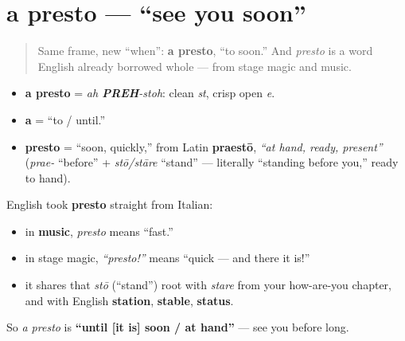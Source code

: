 \section[a presto]{a presto — \textquotedblleft{}see you soon\textquotedblright{}}

\label{lesson:IT-C04-a-presto}



\begin{quote}
Same frame, new \textquotedblleft{}when\textquotedblright{}: \textbf{a presto}, \textquotedblleft{}to soon.\textquotedblright{} And \emph{presto} is a word English already borrowed whole — from stage magic and music.
\end{quote}

\begin{sounds}
\begin{itemize}
\raggedright
  \item \textbf{a presto} = \emph{ah \textbf{PREH}-stoh}: clean \emph{st}, crisp open \emph{e}.
\end{itemize}
\end{sounds}

\begin{cousinweb}
\begin{itemize}
\raggedright
  \item \textbf{a} = \textquotedblleft{}to / until.\textquotedblright{}
  \item \textbf{presto} = \textquotedblleft{}soon, quickly,\textquotedblright{} from Latin \textbf{praestō}, \emph{\textquotedblleft{}at hand, ready, present\textquotedblright{}} (\emph{prae-} \textquotedblleft{}before\textquotedblright{} + \emph{stō/stāre} \textquotedblleft{}stand\textquotedblright{} — literally \textquotedblleft{}standing before you,\textquotedblright{} ready to hand).
\end{itemize}

English took \textbf{presto} straight from Italian:

\begin{itemize}
\raggedright
  \item in \textbf{music}, \emph{presto} means \textquotedblleft{}fast.\textquotedblright{}
  \item in stage magic, \emph{\textquotedblleft{}presto!\textquotedblright{}} means \textquotedblleft{}quick — and there it is!\textquotedblright{}
  \item it shares that \emph{stō} (\textquotedblleft{}stand\textquotedblright{}) root with \emph{stare} from your how-are-you chapter, and with English \textbf{station}, \textbf{stable}, \textbf{status}.
\end{itemize}

So \emph{a presto} is \textbf{\textquotedblleft{}until {[}it is{]} soon / at hand\textquotedblright{}} — see you before long.
\end{cousinweb}

